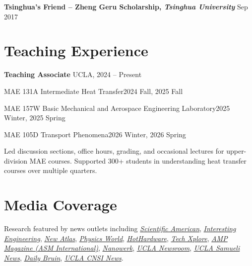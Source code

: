 \documentclass[11pt,letterpaper]{article}
\newcommand{\medialink}[2]{\href{#1}{\textit{#2}}}
\newcommand{\Gap}{\par\addvspace{0.35em}}
\newcommand{\cventryoneline}[2]{
  \textbf{#1} \hfill #2\par
}
\begin{document}
\cventryoneline{Tsinghua's Friend -- Zheng Geru Scholarship, {\mdseries \it Tsinghua University}}{Sep 2017}
\Gap

\section*{Teaching Experience}

\cventryoneline{Teaching Associate}{UCLA, 2024 -- Present}

{ \it

MAE 131A Intermediate Heat Transfer\hfill 2024 Fall, 2025 Fall

MAE 157W Basic Mechanical and Aerospace Engineering Laboratory\hfill 2025 Winter, 2025 Spring

MAE 105D Transport Phenomena\hfill 2026 Winter, 2026 Spring
}

Led discussion sections, office hours, grading, and occasional lectures for upper-division MAE courses. Supported 300+ students in understanding heat transfer courses over multiple quarters.
\Gap

\section*{Media Coverage}

Research featured by news outlets including \medialink{https://www.scientificamerican.com/article/new-metal-with-triple-coppers-heat-conduction-challenges-fundamental-physics/}{Scientific American}, \medialink{https://interestingengineering.com/science/metallic-material-highest-thermal-conductivity-identified}{Interesting Engineering}, \medialink{https://newatlas.com/materials/metallic-material-conducts-heat-3x-tantalum-nitride}{New Atlas}, \medialink{https://physicsworld.com/a/metallic-material-breaks-100-year-thermal-conductivity-record}{Physics World}, \medialink{https://hothardware.com/news/breakthrough-metal-could-revolutionize-chip-cooling-and-thermal-management}{HotHardware}, \medialink{https://techxplore.com/news/2026-01-newly-metallic-material-thermal-upends.html}{Tech Xplore}, \medialink{https://static.asminternational.org/amp/202603/}{AMP Magazine (ASM International)}, \medialink{https://www.nanowerk.com/nanotechnology-news3/newsid\%3D68531.php}{Nanowerk}, \medialink{https://newsroom.ucla.edu/dept/faculty/tantalum-nitride-record-thermal-conductivity-ucla-research}{UCLA Newsroom}, \medialink{https://samueli.ucla.edu/ucla-led-team-discovers-metallic-material-with-record-thermal-conductivity/}{UCLA Samueli News}, \medialink{https://dailybruin.com/2026/02/20/ucla-engineers-discover-metal-with-potential-to-enhance-ai-chip-performance}{Daily Bruin}, \medialink{https://cnsi.ucla.edu/january-16-2026-ucla-led-team-discovers-metallic-material-with-record-thermal-conductivity}{UCLA CNSI News}.
\end{document}
